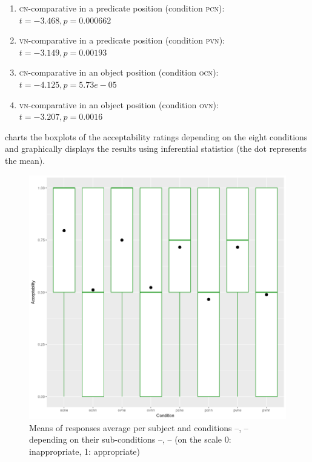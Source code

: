 \documentclass[output=paper,
]{langscibook}
\begin{document}
\begin{enumerate}
\item \textsc{cn-}comparative in a predicate position (condition \textsc{pcn}):\\$t=-3.468,p=0.000662$
\item \textsc{vn-}comparative in a predicate position (condition \textsc{pvn}):\\$t=-3.149,p= 0.00193$
\item \textsc{cn-}comparative in an object position (condition \textsc{ocn}):\\$t=-4.125,p=5.73e-05$ 
\item \textsc{vn-}comparative in an object position (condition \textsc{ovn}):\\$t=-3.207,p=0.0016$
\end{enumerate}

\noindent {} charts the boxplots of the acceptability ratings depending on the eight conditions and graphically displays the results using inferential statistics (the dot represents the mean). 

\begin{figure}[t]
\includegraphics[width=1\linewidth]{figures/Rplot10.png} 
\centering
\caption{Means of responses average per subject and conditions --, -- depending on their sub-conditions --, -- (on the scale 0: inappropriate, 1: appropriate)}
\label{fig:graf}
\end{figure}
\end{document}
